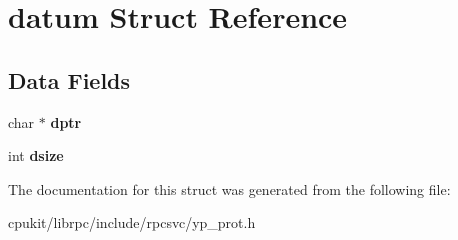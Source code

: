 \hypertarget{structdatum}{}\section{datum Struct Reference}
\label{structdatum}
\subsection*{Data Fields}
\begin{DoxyCompactItemize}
\item 
\mbox{\label{structdatum_a10a7341822a7b5b5abd03080ddb6fe9a}} 
char $\ast$ {\bfseries dptr}
\item 
\mbox{\label{structdatum_a7352d5843988d073054cdc5bfa2f1005}} 
int {\bfseries dsize}
\end{DoxyCompactItemize}


The documentation for this struct was generated from the following file\+:\begin{DoxyCompactItemize}
\item 
cpukit/librpc/include/rpcsvc/yp\+\_\+prot.\+h\end{DoxyCompactItemize}
